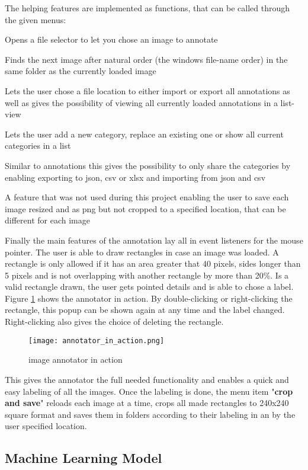 

The helping features are implemented as functions, that can be called through
the given menus:

\begin{description}[font=\sffamily\bfseries, leftmargin=1cm, style=nextline]
    \item[open image]
        Opens a file selector to let you chose an image to annotate
    \item[load next image]
        Finds the next image after natural order (the windows file-name order) in
        the same folder as the currently loaded image
    \item[save/import/view annotations]
        Lets the user chose a file location to either import or export all
        annotations as well as gives the possibility of viewing all currently
        loaded annotations in a list-view
    \item[add/replace/show category]
         Lets the user add a new category, replace an existing one or show all
         current categories in a list
    \item[import/export categories]
        Similar to annotations this gives the possibility to only share the
        categories by enabling exporting to json, csv or xlsx and importing from
        json and csv
    \item[replace/change destination]
        A feature that was not used during this project enabling the user to
        save each image resized and as png but not cropped to a specified
        location, that can be different for each image
\end{description}

Finally the main features of the annotation lay all in event listeners for the
mouse pointer. The user is able to draw rectangles in case an image was loaded.
A rectangle is only allowed if it has an area greater that 40 pixels, sides
longer than 5 pixels and is not overlapping with another rectangle by more than
20\%. Is a valid rectangle drawn, the user gets pointed details and is able to
chose a label. Figure \ref{fig:anno} shows the annotator in action. By
double-clicking or right-clicking the rectangle, this popup can be shown again
at any time and the label changed. Right-clicking also gives the choice of
deleting the rectangle.
\begin{figure}
    \texttt{[image: annotator\_in\_action.png]}
    \caption{image annotator in action}
    \label{fig:anno}
\end{figure}
\newline
This gives the annotator the full needed functionality and enables a quick and
easy labeling of all the images. Once the labeling is done, the menu item
"\textbf{crop and save}" reloads each image at a time, crops all made rectangles
to 240x240 square format and saves them in folders according to their labeling
in an by the user specified location.

\subsection{Machine Learning Model}
